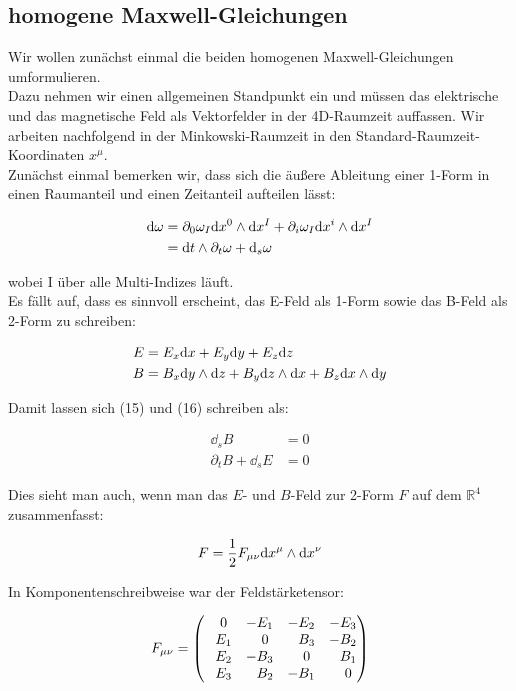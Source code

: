 \subsection{homogene Maxwell-Gleichungen}
Wir wollen zunächst einmal die beiden homogenen Maxwell-Gleichungen umformulieren. \\
Dazu nehmen wir einen allgemeinen Standpunkt ein und müssen das elektrische und das magnetische Feld als Vektorfelder in der 4D-Raumzeit auffassen. Wir arbeiten nachfolgend in der Minkowski-Raumzeit in den Standard-Raumzeit-Koordinaten $x^{\mu}$. \\
Zunächst einmal bemerken wir, dass sich die äußere Ableitung einer 1-Form in einen Raumanteil und einen Zeitanteil aufteilen lässt:

\begin{align}
\dd \omega &= \partial_0 \omega_I \dd x^0 \wedge \dd x^{I} + \partial_i \omega_I \dd x^i \wedge \dd x^{I} \notag\\
&= \dd t \wedge \partial_t \omega + \dd_s \omega 
\end{align}

wobei I über alle Multi-Indizes läuft. \\
Es fällt auf, dass es sinnvoll erscheint, das E-Feld als 1-Form sowie das B-Feld als 2-Form zu schreiben:

\begin{align}
E &= E_x \dd x +E_y \dd y + E_z \dd z   \\
B &= B_x \dd y \wedge \dd z + B_y \dd z \wedge \dd x + B_z \dd x \wedge \dd y 
\end{align}

Damit lassen sich (15) und (16) schreiben als:

\begin{align}
\dd_s B &= 0 \\
\partial_t B + \dd_s E &=0
\end{align}

Dies sieht man auch, wenn man das $E$- und $B$-Feld zur 2-Form $F$ auf dem $\mathbb{R}^4$ zusammenfasst:

\begin{align}
F = \frac{1}{2} F_{\mu \nu} \dd x^{\mu} \wedge \dd x^{\nu}
\end{align}

In Komponentenschreibweise war der Feldstärketensor:

\begin{align}
F_{\mu \nu} =
\begin{pmatrix}
\phantom{-}0 & -E_1 & -E_2 & -E_3 \\
\phantom{-}E_1 & \phantom{-}0 & \phantom{-}B_3 & -B_2 \\
\phantom{-}E_2 & -B_3 & \phantom{-}0 & \phantom{-}B_1 \\
\phantom{-}E_3 & \phantom{-}B_2 & -B_1 & \phantom{-}0
\end{pmatrix}
\end{align}

